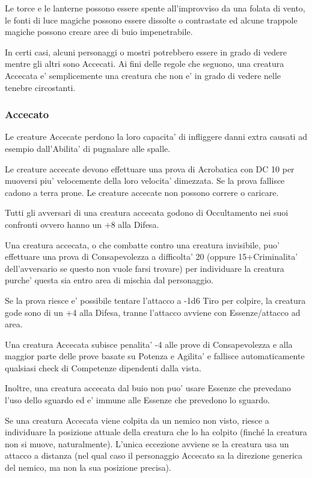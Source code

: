 \documentclass[a4paper,11pt,twoside,openany]{book}
\begin{document}
{\label{buio}

Le torce e le lanterne possono essere spente all'improvviso da una folata di vento, le fonti di luce magiche possono essere dissolte o contrastate ed alcune trappole magiche possono creare aree di buio impenetrabile.

In certi casi, alcuni personaggi o mostri potrebbero essere in grado di vedere mentre gli altri sono Accecati. Ai fini delle regole che seguono, una creatura Accecata e' semplicemente una creatura che non e' in grado di vedere nelle tenebre circostanti.

\subsubsection{Accecato}

\label{accecato}

Le creature Accecate perdono la loro capacita' di infliggere danni extra causati ad esempio dall'Abilita' di pugnalare alle spalle.

Le creature accecate devono effettuare una prova di Acrobatica con DC 10 per muoversi piu' velocemente della loro velocita' dimezzata. Se la prova fallisce cadono a terra prone. Le creature accecate non possono correre o caricare.

Tutti gli avversari di una creatura accecata godono di Occultamento nei suoi confronti ovvero hanno un +8 alla Difesa.

Una creatura accecata, o che combatte contro una creatura invisibile, puo' effettuare una prova di Consapevolezza a difficolta' 20 (oppure 15+Criminalita' dell'avversario se questo non vuole farsi trovare) per individuare la creatura purche' questa sia entro area di mischia dal personaggio.

Se la prova riesce e' possibile tentare l'attacco a -1d6 Tiro per colpire, la creatura gode sono di un +4 alla Difesa, tranne l'attacco avviene con Essenze/attacco ad area.

Una creatura Accecata subisce penalita' -4 alle prove di Consapevolezza e alla maggior parte delle prove basate su Potenza e Agilita' e fallisce automaticamente qualsiasi check di Competenze dipendenti dalla vista. 

Inoltre, una creatura accecata dal buio non puo' usare Essenze che prevedano l'uso dello sguardo ed e' immune alle Essenze che prevedono lo sguardo.

Se una creatura Accecata viene colpita da un nemico non visto, riesce a individuare la posizione attuale della creatura che lo ha colpito (finché la creatura non si muove, naturalmente). L'unica eccezione avviene se la creatura usa un attacco a distanza (nel qual caso il personaggio Accecato sa la direzione generica del nemico, ma non la sua posizione precisa).

}
\end{document}
